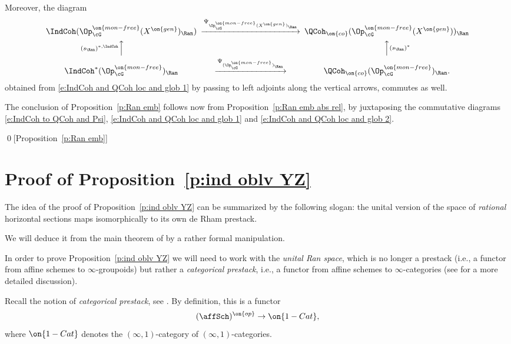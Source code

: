 \documentclass[9pt]{amsart}
\theoremstyle{remark}
\theoremstyle{definition}
\theoremstyle{remark}
\newcommand{\propref}[1]{Proposition~\ref{#1}}
\numberwithin{equation}{section}
\begin{document}
\medskip

Moreover, the diagram
\begin{equation} \label{e:IndCoh and QCoh loc and glob 2} 
\CD
\IndCoh(\Op^{\on{mon-free}}_\cG(X^{\on{gen}})_\Ran) @>{\Psi_{\Op^{\on{mon-free}}_\cG(X^{\on{gen}})_\Ran}}>> 
\QCoh_{\on{co}}(\Op^{\on{mon-free}}_\cG(X^{\on{gen}}))_\Ran  \\
@A{(s_\Ran)^{*,\IndCoh}}AA @AA{(s_\Ran)^*}A \\
\IndCoh^*(\Op^{\on{mon-free}}_\cG)_\Ran @>{\Psi_{(\Op^{\on{mon-free}}_\cG)_\Ran}}>> 
\QCoh_{\on{co}}(\Op^{\on{mon-free}}_\cG)_\Ran.
\endCD
\end{equation} 
obtained from \eqref{e:IndCoh and QCoh loc and glob 1} by passing to left adjoints along the vertical arrows, 
commutes as well. 

\medskip

The conclusion of \propref{p:Ran emb} follows now from \propref{p:Ran emb abs rel}, by juxtaposing the commutative diagrams
\eqref{e:IndCoh to QCoh and Psi}, \eqref{e:IndCoh and QCoh loc and glob 1} and \eqref{e:IndCoh and QCoh loc and glob 2}. 

\qed[\propref{p:Ran emb}]

\appendix

\section{Proof of \propref{p:ind oblv YZ}} \label{s:proof of ind oblv}

The idea of the proof of \propref{p:ind oblv YZ}
can be summarized by the following slogan: the unital version of the space of \emph{rational}
horizontal sections maps isomorphically to its own de Rham prestack. 

\medskip

We will deduce it from the main theorem of \cite{Ro} by a rather formal manipulation. 


In order to prove \propref{p:ind oblv YZ} we will need to work with the \emph{unital Ran space},
which is no longer a prestack (i.e., a functor from affine schemes to $\infty$-groupoids) but rather a 
\emph{categorical prestack}, i.e., a functor from affine schemes to $\infty$-categories (see
\cite[Sect. C.5]{GLC2} for a more detailed discussion). 

\sssec{}

Recall the notion of \emph{categorical prestack}, see \cite[Appendix C]{Ro}. By definition, this is a functor
$$(\affSch)^{\on{op}}\to \on{1-Cat},$$
where $\on{1-Cat}$ denotes the $(\infty,1)$-category of $(\infty,1)$-categories. 
\end{document}
